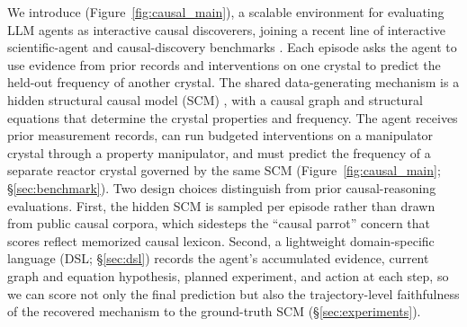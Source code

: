 We introduce \projectname{} (Figure~\ref{fig:causal_main}), a scalable environment for evaluating LLM agents as interactive causal discoverers, joining a recent line of interactive scientific-agent and causal-discovery benchmarks \citep{DBLP:journals/corr/abs-2406-06769,igda2025,chen2026causalgame,chen2025autobench,geng2025reliableaiscientists}. Each episode asks the agent to use evidence from prior records and interventions on one crystal to predict the held-out frequency of another crystal. The shared data-generating mechanism is a hidden structural causal model (SCM) \citep{Pearl_2009}, with a causal graph and structural equations that determine the crystal properties and frequency.
The agent receives prior measurement records, can run budgeted interventions on a manipulator crystal through a property manipulator, and must predict the frequency of a separate reactor crystal governed by the same SCM (Figure~\ref{fig:causal_main}; \S\ref{sec:benchmark}). Two design choices distinguish \projectname{} from prior causal-reasoning evaluations. First, the hidden SCM is sampled per episode rather than drawn from public causal corpora, which sidesteps the ``causal parrot'' concern that scores reflect memorized causal lexicon. Second, a lightweight domain-specific language (DSL; \S\ref{sec:dsl}) records the agent's accumulated evidence, current graph and equation hypothesis, planned experiment, and action at each step, so we can score not only the final prediction but also the trajectory-level faithfulness of the recovered mechanism to the ground-truth SCM (\S\ref{sec:experiments}).

